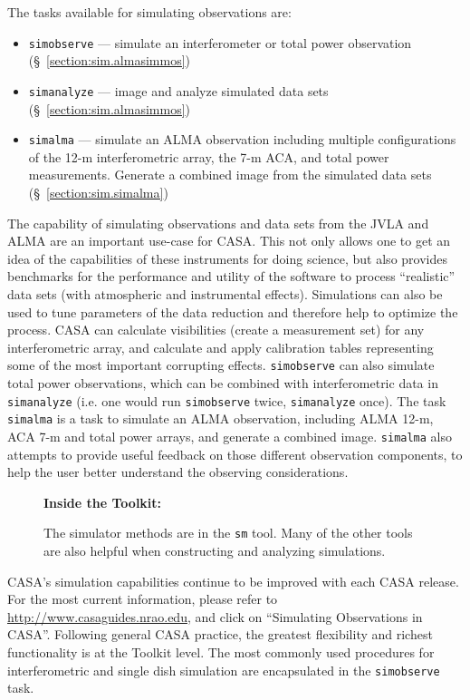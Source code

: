 The tasks available for simulating observations are:
\begin{itemize}
\item {\tt simobserve} --- simulate an interferometer or total power
observation (\S~\ref{section:sim.almasimmos})
\item {\tt simanalyze} --- image and analyze simulated data sets
(\S~\ref{section:sim.almasimmos})
\item {\tt simalma} --- simulate an ALMA observation including
  multiple configurations of the 12-m interferometric array, the 7-m
  ACA, and total power measurements. Generate a combined image from
  the simulated data sets (\S~\ref{section:sim.simalma})
\end{itemize}

The capability of simulating observations and data sets from the JVLA
and ALMA are an important use-case for CASA.  This not only allows one
to get an idea of the capabilities of these instruments for doing
science, but also provides benchmarks for the performance and utility
of the software to process ``realistic'' data sets (with atmospheric
and instrumental effects).  Simulations can also be used to tune
parameters of the data reduction and therefore help to optimize the
process.  CASA can calculate visibilities (create a measurement set)
for any interferometric array, and calculate and apply calibration
tables representing some of the most important corrupting
effects. {\tt simobserve} can also simulate total power observations,
which can be combined with interferometric data in {\tt simanalyze}
(i.e. one would run {\tt simobserve} twice, {\tt simanalyze} once).
The task {\tt simalma} is a task to simulate an ALMA observation,
including ALMA 12-m, ACA 7-m and total power arrays, and generate a
combined image.  {\tt simalma} also attempts to provide useful
feedback on those different observation components, to help the user
better understand the observing considerations.


\begin{wrapfigure}{r}{2.5in}
 \begin{boxedminipage}{2.5in}
    \centerline{\bf Inside the Toolkit:}
    The simulator methods are in the {\tt sm} tool.
    Many of the other tools are also helpful when
    constructing and analyzing simulations.
 \end{boxedminipage}
\end{wrapfigure}

CASA's simulation capabilities continue to be improved with each CASA release.
For the most current information, please refer to
\url{http://www.casaguides.nrao.edu}, and click on
``Simulating Observations in CASA''.
%
Following general CASA practice, the greatest flexibility and richest
functionality is at the Toolkit level.  The most commonly used
procedures for interferometric and single dish simulation are
encapsulated in the {\tt simobserve} task.


